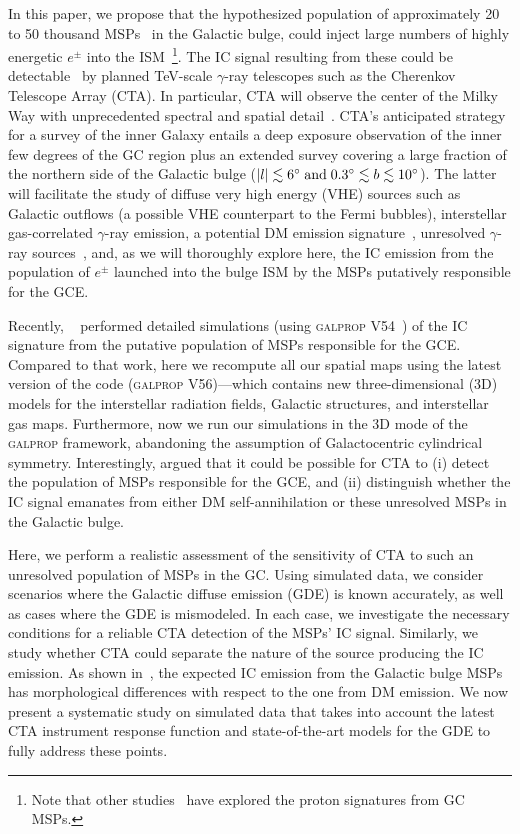 \documentclass[doublespace,nopageskip]{VTthesis} %
\begin{document}
In this paper, we propose that the hypothesized population of approximately 20 to 50 thousand MSPs~\citep{Ploeg:2020jeh} in the Galactic bulge, could inject large numbers of highly energetic $e^{\pm}$ into the ISM~\footnote{Note that other studies~\citep[e.g.,][]{Guepin:2018jkb} have explored the proton signatures from GC MSPs.}. The  IC signal resulting from these could be detectable~\citep{Song:2019nrx} by planned TeV-scale $\gamma$-ray telescopes such as 
the Cherenkov Telescope Array (CTA). 
%
In particular, CTA will observe the center of the Milky Way with unprecedented spectral and spatial detail~\citep{CTAConsortium:2018tzg}. 
%
CTA's anticipated strategy for a survey of the inner Galaxy entails a deep exposure observation of the inner few degrees of the GC region plus an extended survey covering a large fraction of the northern side of the Galactic bulge ($|l|\lesssim 6^{\circ}\;{\rm and}\; 0.3^{\circ}\lesssim b \lesssim 10^{\circ}$). The latter will facilitate the study of diffuse very high energy (VHE) sources such as Galactic outflows (a possible VHE counterpart to the Fermi bubbles), interstellar gas-correlated $\gamma$-ray emission, a potential DM emission signature~\citep{Acharyya:2020sbj}, unresolved $\gamma$-ray sources~\citep{Viana:2019jwd}, and, as we will thoroughly explore here, the IC emission from the 
population of $e^\pm$ launched into the bulge ISM by the
 MSPs putatively responsible for the GCE.  



 Recently, ~\cite{Song:2019nrx} performed detailed simulations (using \textsc{galprop} V54~\citealt{Porter:2006tb}) of the IC signature from the putative population of MSPs responsible for the GCE. Compared to that work, here we recompute all our spatial maps using the latest version of the code (\textsc{galprop} V56)---which contains new three-dimensional (3D) models for the interstellar radiation fields, Galactic structures, and interstellar gas maps. Furthermore, now we run our simulations in the 3D mode of the \textsc{galprop} framework, abandoning the assumption of Galactocentric cylindrical symmetry. Interestingly, \cite{Song:2019nrx} argued that it could be possible for CTA to (i) detect the population of MSPs responsible for the GCE, and (ii) distinguish whether the IC signal emanates from either DM self-annihilation or these unresolved MSPs in the Galactic bulge. 
 
 Here, we perform a realistic assessment of the sensitivity of CTA to such an unresolved population of MSPs in the GC. Using simulated data, we consider scenarios where the Galactic diffuse emission (GDE) is known accurately, as well as cases where the GDE is mismodeled. In each case, we investigate the necessary conditions for a reliable CTA detection of the MSPs' IC signal. Similarly, we study whether CTA could separate the nature of the source producing the IC emission. As shown in~\citet{Song:2019nrx}, the expected IC emission from the Galactic bulge MSPs has morphological differences with respect to the one from DM emission. We now present a systematic study on simulated data that takes into account the latest CTA instrument response function and state-of-the-art models for the GDE to fully address these points.
 
\end{document}
